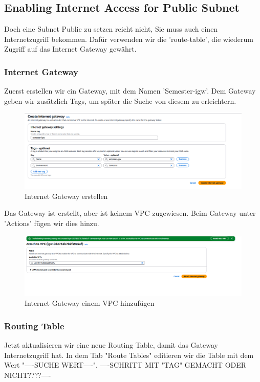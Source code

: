 \documentclass[a4paper,12pt]{article}
\begin{document}
\subsection{Enabling Internet Access for Public Subnet}
Doch eine Subnet Public zu setzen reicht nicht, Sie muss auch einen Internetzugriff bekommen.
Dafür verwenden wir die 'route-table', die wiederum Zugriff auf das Internet Gateway gewährt.

\subsubsection{Internet Gateway}
Zuerst erstellen wir ein Gateway, mit dem Namen 'Semester-igw'. 
Dem Gateway geben wir zusätzlich Tags, um später die Suche von diesem zu erleichtern.

\begin{figure}[h!]
	\centering
	\includegraphics[width=\textwidth]{data/Create_IGW.png}
	\caption{Internet Gateway erstellen}
	\label{fig:Internet Gateway}
\end{figure}

Das Gateway ist erstellt, aber ist keinem VPC zugewiesen. 
Beim Gateway unter 'Actions' fügen wir dies hinzu.

\begin{figure}[h!]
	\centering
	\includegraphics[width=\textwidth]{data/Attach_IGW.png}
	\caption{Internet Gateway einem VPC hinzufügen}
	\label{fig:Attach Internet Gateway}
\end{figure}

\subsubsection{Routing Table}
Jetzt aktualisieren wir eine neue Routing Table, damit das Gateway Internetzugriff hat.
In dem Tab "Route Tables" editieren wir die Table mit dem Wert "----SUCHE WERT----".
----SCHRITT MIT "TAG" GEMACHT ODER NICHT????----
\end{document}
